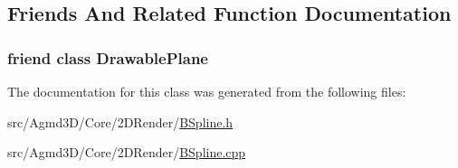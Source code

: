 \subsection{Friends And Related Function Documentation}
\hypertarget{class_agmd_1_1_b_spline_abd140f9d7517b23f834000b9238bd85f}{
\subsubsection[{Drawable\+Plane}]{\setlength{\rightskip}{0pt plus 5cm}friend class {\bf Drawable\+Plane}\hspace{0.3cm}{\ttfamily [friend]}}}\label{class_agmd_1_1_b_spline_abd140f9d7517b23f834000b9238bd85f}


The documentation for this class was generated from the following files\+:\begin{DoxyCompactItemize}
\item 
src/\+Agmd3\+D/\+Core/2\+D\+Render/\hyperlink{_b_spline_8h}{B\+Spline.\+h}\item 
src/\+Agmd3\+D/\+Core/2\+D\+Render/\hyperlink{_b_spline_8cpp}{B\+Spline.\+cpp}\end{DoxyCompactItemize}
